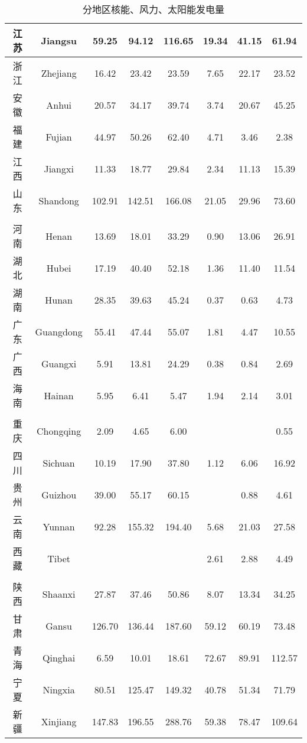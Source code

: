 \begin{table}[htbp]
\begin{tabular}{|c|c|c|c|c|c|c|c|}
    江  苏 & Jiangsu & 59.25 & 94.12 & 116.65 & 19.34 & 41.15 & 61.94 \\ \hline
    浙  江 & Zhejiang & 16.42 & 23.42 & 23.59 & 7.65 & 22.17 & 23.52 \\ \hline
    安  徽 & Anhui & 20.57 & 34.17 & 39.74 & 3.74 & 20.67 & 45.25 \\ \hline
    福  建 & Fujian & 44.97 & 50.26 & 62.40 & 4.71 & 3.46 & 2.38 \\ \hline
    江  西 & Jiangxi & 11.33 & 18.77 & 29.84 & 2.34 & 11.13 & 15.39 \\ \hline
    山  东 & Shandong & 102.91 & 142.51 & 166.08 & 21.05 & 29.96 & 73.60 \\ \hline
     &  &  &  &  &  &  &  \\ \hline
    河  南 & Henan & 13.69 & 18.01 & 33.29 & 0.90 & 13.06 & 26.91 \\ \hline
    湖  北 & Hubei & 17.19 & 40.40 & 52.18 & 1.36 & 11.40 & 11.54 \\ \hline
    湖  南 & Hunan & 28.35 & 39.63 & 45.24 & 0.37 & 0.63 & 4.73 \\ \hline
    广  东 & Guangdong & 55.41 & 47.44 & 55.07 & 1.81 & 4.47 & 10.55 \\ \hline
    广  西 & Guangxi & 5.91 & 13.81 & 24.29 & 0.38 & 0.84 & 2.69 \\ \hline
    海  南 & Hainan & 5.95 & 6.41 & 5.47 & 1.94 & 2.14 & 3.01 \\ \hline
     &  &  &  &  &  &  &  \\ \hline
    重  庆 & Chongqing & 2.09 & 4.65 & 6.00 &  &  & 0.55 \\ \hline
    四  川 & Sichuan & 10.19 & 17.90 & 37.80 & 1.12 & 6.06 & 16.92 \\ \hline
    贵  州 & Guizhou & 39.00 & 55.17 & 60.15 &  & 0.88 & 4.61 \\ \hline
    云  南 & Yunnan & 92.28 & 155.32 & 194.40 & 5.68 & 21.03 & 27.58 \\ \hline
    西  藏 & Tibet &  &  &  & 2.61 & 2.88 & 4.49 \\ \hline
     &  &  &  &  &  &  &  \\ \hline
    陕  西 & Shaanxi & 27.87 & 37.46 & 50.86 & 8.07 & 13.34 & 34.25 \\ \hline
    甘  肃 & Gansu & 126.70 & 136.44 & 187.60 & 59.12 & 60.19 & 73.48 \\ \hline
    青  海 & Qinghai & 6.59 & 10.01 & 18.61 & 72.67 & 89.91 & 112.57 \\ \hline
    宁  夏 & Ningxia & 80.51 & 125.47 & 149.32 & 40.78 & 51.34 & 71.79 \\ \hline
    新  疆 & Xinjiang & 147.83 & 196.55 & 288.76 & 59.38 & 78.47 & 109.64 \\ \hline
    \end{tabular}
    \caption{分地区核能、风力、太阳能发电量}
    \label{tab:PowerGenerated}
\end{table}

